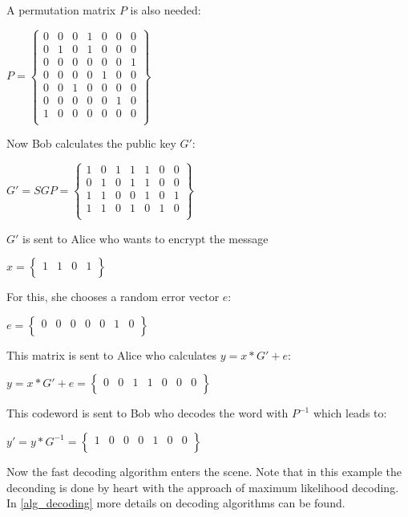 A permutation matrix $P$ is also needed: 
\begin{center}
	$
	P =
	\begin{Bmatrix}
	0 & 0 & 0 & 1 & 0 & 0 & 0 \\
	0 & 1 & 0 & 1 & 0 & 0 & 0 \\
	0 & 0 & 0 & 0 & 0 & 0 & 1 \\
	0 & 0 & 0 & 0 & 1 & 0 & 0 \\
	0 & 0 & 1 & 0 & 0 & 0 & 0 \\
	0 & 0 & 0 & 0 & 0 & 1 & 0 \\
	1 & 0 & 0 & 0 & 0 & 0 & 0 \\
	
	\end{Bmatrix}
	$
\end{center}
Now Bob calculates the public key $G'$: 
\begin{center}
	$
	G' = SGP =
	\begin{Bmatrix}
	1 & 0 & 1 & 1 & 1 & 0 & 0 \\
	0 & 1 & 0 & 1 & 1 & 0 & 0 \\
	1 & 1 & 0 & 0 & 1 & 0 & 1 \\
	1 & 1 & 0 & 1 & 0 & 1 & 0 \\
	
	\end{Bmatrix}
	$
\end{center}
$G'$ is sent to Alice who wants to encrypt the message 	
\begin{center}
$
x =
\begin{Bmatrix}
1 & 1 & 0 & 1 \\
\end{Bmatrix}
$ 
\end{center}
For this, she chooses a random error vector $e$:
\begin{center}
	$
	e =
	\begin{Bmatrix}
	0 & 0 & 0 & 0 & 0 & 1 & 0 \\
	\end{Bmatrix}
	$
\end{center}
This matrix is sent to Alice who calculates $y = x*G'+e$:
\begin{center}
	$
	y = x*G'+e =
	\begin{Bmatrix}
	0 & 0 & 1 & 1 & 0 & 0 & 0 \\
	\end{Bmatrix}
	$
\end{center}
This codeword is sent to Bob who decodes the word with $P^{-1}$ which leads to:
\begin{center}
	$
	y' = y*G^{-1} =
	\begin{Bmatrix}
	1 & 0 & 0 & 0 & 1 & 0 & 0 \\
	\end{Bmatrix}
	$
\end{center}
Now the fast decoding algorithm enters the scene. Note that in this example the deconding is done by heart with the approach of maximum likelihood decoding. In \autoref{alg_decoding} more details on decoding algorithms can be found. 

